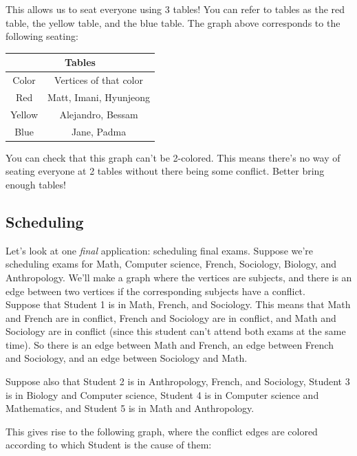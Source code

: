 This allows us to seat everyone using 3 tables! You can refer to tables as the red table, the yellow table, and the blue table. The graph above corresponds to the following seating:

\begin{center}
\begin{tabular}{c|c}
 \multicolumn{2}{c}{Tables}\\
\hline
 Color & Vertices of that color \\
 \hline
 \hline
 Red & Matt, Imani, Hyunjeong\\
 \hline
  Yellow & Alejandro, Bessam \\
 \hline
  Blue & Jane, Padma \\
 \end{tabular}
 \end{center}
 
 You can check that this graph can't be 2-colored. This means there's no way of seating everyone at 2 tables without there being some conflict. Better bring enough tables!\\
 
\subsection{Scheduling}
Let's look at one \textit{final} application: scheduling final exams. 
Suppose we're scheduling exams for Math, Computer science, French, Sociology, Biology, and Anthropology.
We'll make a graph where the vertices are subjects, and there is an edge between two vertices if the corresponding subjects have a conflict.\\

Suppose that Student 1 is in Math, French, and Sociology.
This means that Math and French are in conflict, French and Sociology are in conflict, and Math and Sociology are in conflict (since this student can't attend both exams at the same time).
So there is an edge between Math and French, an edge between French and Sociology, and an edge between Sociology and Math.


Suppose also that
Student 2 is in Anthropology, French, and Sociology, Student 3 is in Biology and Computer science, Student 4 is in Computer science and Mathematics, and Student 5 is in Math and Anthropology.

This gives rise to the following graph, where the conflict edges are colored according to which Student is the cause of them:

